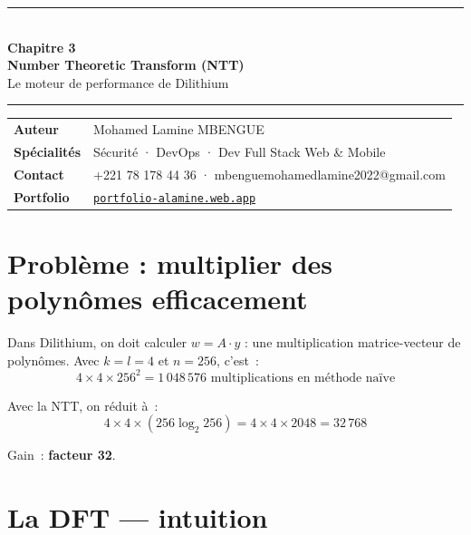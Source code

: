 \documentclass[12pt, a4paper]{article}
\begin{document}
\begin{center}
  {\color{suva_blue}\rule{\linewidth}{2pt}}\\[0.5cm]
  {\Huge\bfseries\color{suva_blue} Chapitre 3}\\[0.3cm]
  {\large\bfseries Number Theoretic Transform (NTT)}\\[0.2cm]
  {\small\color{gray} Le moteur de performance de Dilithium}\\[0.3cm]
  {\color{suva_blue}\rule{\linewidth}{2pt}}
\end{center}

\begin{tcolorbox}[colback=suva_blue!5, colframe=suva_blue!40,
  left=6pt, right=6pt, top=4pt, bottom=4pt]
\small
\begin{tabular}{ll}
  \textbf{Auteur} & Mohamed Lamine MBENGUE \\
  \textbf{Spécialités} & Sécurité · DevOps · Dev Full Stack Web \& Mobile \\
  \textbf{Contact} & +221 78 178 44 36 · mbenguemohamedlamine2022@gmail.com \\
  \textbf{Portfolio} & \href{https://portfolio-alamine.web.app}{\texttt{portfolio-alamine.web.app}} \\
\end{tabular}
\end{tcolorbox}

\tableofcontents
\newpage

\section{Problème : multiplier des polynômes efficacement}

Dans Dilithium, on doit calculer $w = A \cdot y$ : une multiplication
matrice-vecteur de polynômes. Avec $k = l = 4$ et $n = 256$, c'est~:
$$4 \times 4 \times 256^2 = 1\,048\,576 \text{ multiplications en méthode naïve}$$

Avec la NTT, on réduit à~:
$$4 \times 4 \times (256 \log_2 256) = 4 \times 4 \times 2048 = 32\,768$$

Gain~: \textbf{facteur 32}.

\section{La DFT --- intuition}
\end{document}

